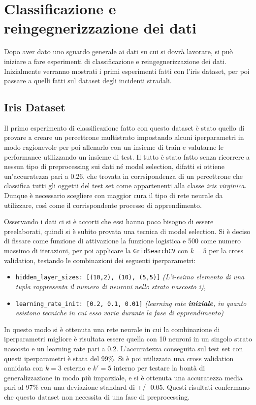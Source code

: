 \documentclass[12pt, twoside, letterpaper]{report}
\begin{document}
	\section{Classificazione e reingegnerizzazione dei dati} 
		Dopo aver dato uno sguardo generale ai dati su cui si dovrà lavorare, si può iniziare a fare esperimenti di classificazione e reingegnerizzazione dei dati. Inizialmente verranno mostrati i primi esperimenti fatti con l'iris dataset, per poi passare a quelli fatti sul dataset degli incidenti stradali. 
		
		\subsection{Iris Dataset}
			Il primo esperimento di classificazione fatto con questo dataset è stato quello di provare a creare un percettrone multistrato impostando alcuni iperparametri in modo ragionevole per poi allenarlo con un insieme di train e valutarne le performance utilizzando un insieme di test. Il tutto è stato fatto senza ricorrere a nessun tipo di preprocessing sui dati né model selection, difatti si ottiene un'accuratezza pari a 0.26, che trovata in corrsipondenza di un percettrone che classifica tutti gli oggetti del test set come appartenenti alla classe \textit{iris virginica}. Dunque è necessario scegliere con maggior cura il tipo di rete neurale da utilizzare, così come il corrispondente processo di apprendimento. 



			Osservando i dati ci si è accorti che essi hanno poco bisogno di essere preelaborati, quindi si è subito provata una tecnica di model selection. Si è deciso di fissare come funzione di attivazione la funzione logistica e 500 come numero massimo di iterazioni, per poi applicare la \texttt{GridSearchCV} con $k=5$ per la cross validation, testando le combinazioni dei seguenti iperparametri:
			\begin{itemize}
				\item \texttt{hidden\_layer\_sizes: [(10,2), (10), (5,5)]} \textit{(L'i-esimo elemento di una tupla rappresenta il numero di neuroni nello strato nascosto i)},
	    		\item \texttt{learning\_rate\_init: [0.2, 0.1, 0.01]} \textit{(learning rate \textbf{iniziale}, in quanto esistono tecniche in cui esso varia durante la fase di apprendimento)}
			\end{itemize}
			In questo modo si è ottenuta una rete neurale in cui la combinazione di iperparametri migliore è risultata essere quella con 10 neuroni in un singolo strato nascosto e un learning rate pari a 0.2. L'accuratezza conseguita sul test set con questi iperparametri è  stata del 99\%. Si è poi utilizzata una cross validation annidata con $k = 3$ esterno e $k' = 5$  interno per testare la bontà di generalizzazione in modo più imparziale, e si è ottenuta una accuratezza media pari al 97\% con una deviazione standard di +/- 0.05. Questi risultati confermano che questo dataset non necessita di una fase di preprocessing.
		
\end{document}
